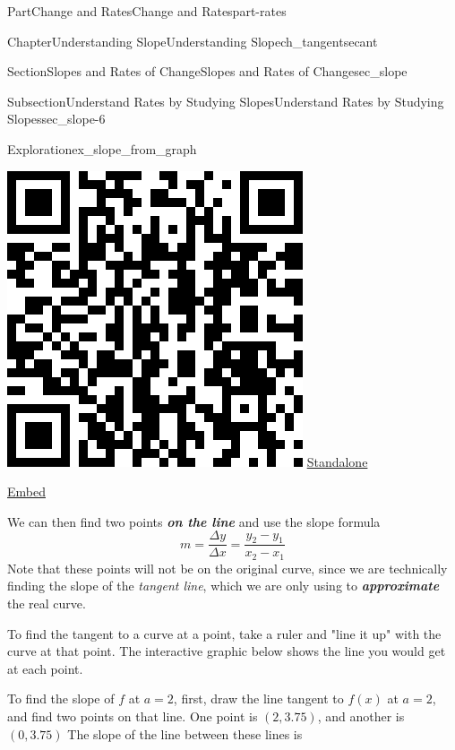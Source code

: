 \documentclass{tufte-book}
\newcommand{\alert}[1]{\textbf{\textit{#1}}}
\numberwithin{equation}{chapter}
\begin{document}
\begin{partptx}{Part}{Change and Rates}{}{Change and Rates}{}{}{part-rates}
\begin{chapterptx}{Chapter}{Understanding Slope}{}{Understanding Slope}{}{}{ch_tangentsecant}
\begin{sectionptx}{Section}{Slopes and Rates of Change}{}{Slopes and Rates of Change}{}{}{sec_slope}
\begin{subsectionptx}{Subsection}{Understand Rates by Studying Slopes}{}{Understand Rates by Studying Slopes}{}{}{sec_slope-6}
\begin{exploration}{Exploration}{}{ex_slope_from_graph}
\begin{enumerate}[font=\bfseries,label=(\alph*),ref=\alph*]
\begin{sidebyside}{2}{0.075}{0.075}{0.17}
\begin{sbspanel}{0.21}
\includegraphics[width=\linewidth]{generated/qrcode/ex_slope_from_graph-3-2-2.png}
\href{http://webwork.bridgew.edu/oer/functions_at_work/ex_slope_from_graph-3-2-2.html}{Standalone}%
\par
\href{http://webwork.bridgew.edu/oer/functions_at_work/ex_slope_from_graph-3-2-2-if.html}{Embed}%
\end{sbspanel}%
\end{sidebyside}%
\par
We can then find two points \alert{on the line} and use the slope formula%
\begin{equation*}
m = \dfrac{\Delta y}{\Delta x} = \dfrac{y_2-y_1}{x_2-x_1}
\end{equation*}
Note that these points will not be on the original curve, since we are technically finding the slope of the \emph{tangent line}, which we are only using to \alert{approximate} the real curve.%
\par
To find the tangent to a curve at a point, take a ruler and "line it up" with the curve at that point. The interactive graphic below shows the line you would get at each point.%
\par
To find the slope of \(f\) at \(a=2\), first, draw the line tangent to \(f(x)\) at \(a=2\), and find two points on that line. One point is \((2,3.75)\), and another is \((0,3.75)\) The slope of the line between these lines is%

\end{enumerate}
\end{exploration}
\end{subsectionptx}
\end{sectionptx}
\end{chapterptx}
\end{partptx}
\end{document}
